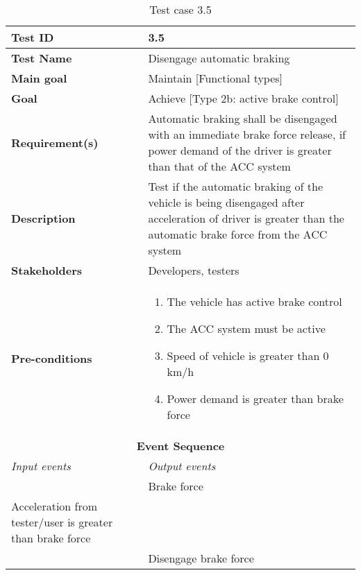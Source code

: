 \begin{table}[H]
\centering
\begin{tabularx}{\linewidth}{X|X}
  \hline
  \textbf{Test ID} & 3.5\\
  \hline
  \textbf{Test Name} & Disengage automatic braking \\
  \hline
  \textbf{Main goal} &  Maintain [Functional types]\\
  \hline
  \textbf{Goal} & Achieve [Type 2b: active brake control] \\
  \hline
  \textbf{Requirement(s)} & Automatic braking shall be disengaged with an immediate brake force release, if power demand of the driver is greater than that of the ACC system\\
  \hline
  \textbf{Description} & Test if the automatic braking of the vehicle is being disengaged after acceleration of driver is greater than the automatic brake force from the ACC system \\
  \hline
  \textbf{Stakeholders} & Developers, testers \\
  \hline
  \textbf{Pre-conditions} & 
  \begin{enumerate}
      \item The vehicle has active brake control
      \item The ACC system must be active
      \item Speed of vehicle is greater than 0 km/h
      \item Power demand is greater than brake force
  \end{enumerate} \\
  \hline
  \multicolumn{2}{c}{\textbf{Event Sequence}} \\
  \hline
  \textit{Input events} & \textit{Output events} \\
  \hline
    & Brake force \\
  \hline
   Acceleration from tester/user is greater than brake force &  \\
  \hline
   & Disengage brake force \\
  \hline
  \end{tabularx}
\caption{\label{tab_caseX} Test case 3.5}
\end{table}